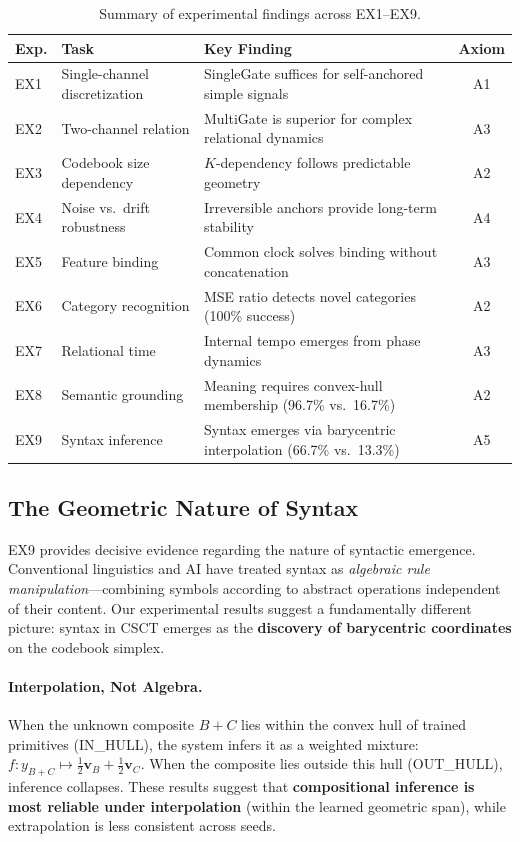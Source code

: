 \documentclass{article}
\begin{document}
\begin{table}[h]
\centering
\small
\caption{Summary of experimental findings across EX1--EX9.}
\label{tab:experiment_summary}
\begin{tabularx}{\linewidth}{@{} l p{3.5cm} X c @{}}
\toprule
\textbf{Exp.} & \textbf{Task} & \textbf{Key Finding} & \textbf{Axiom} \\
\midrule
EX1 & Single-channel discretization & SingleGate suffices for self-anchored simple signals & A1 \\
EX2 & Two-channel relation & MultiGate is superior for complex relational dynamics & A3 \\
EX3 & Codebook size dependency & $K$-dependency follows predictable geometry & A2 \\
EX4 & Noise vs.\ drift robustness & Irreversible anchors provide long-term stability & A4 \\
EX5 & Feature binding & Common clock solves binding without concatenation & A3 \\
EX6 & Category recognition & MSE ratio detects novel categories (100\% success) & A2 \\
EX7 & Relational time & Internal tempo emerges from phase dynamics & A3 \\
EX8 & Semantic grounding & Meaning requires convex-hull membership (96.7\% vs.\ 16.7\%) & A2 \\
EX9 & Syntax inference & Syntax emerges via barycentric interpolation (66.7\% vs.\ 13.3\%) & A5 \\
\bottomrule
\end{tabularx}
\end{table}

\subsection{The Geometric Nature of Syntax}

EX9 provides decisive evidence regarding the nature of syntactic emergence.
Conventional linguistics and AI have treated syntax as \emph{algebraic rule manipulation}---combining symbols according to abstract operations independent of their content.
Our experimental results suggest a fundamentally different picture: syntax in CSCT emerges as the \textbf{discovery of barycentric coordinates} on the codebook simplex.

\paragraph{Interpolation, Not Algebra.}
When the unknown composite $B{+}C$ lies within the convex hull of trained primitives (IN\_HULL), the system infers it as a weighted mixture: $f: y_{B+C} \mapsto \tfrac{1}{2}\mathbf{v}_B + \tfrac{1}{2}\mathbf{v}_C$.
When the composite lies outside this hull (OUT\_HULL), inference collapses.
These results suggest that \textbf{compositional inference is most reliable under interpolation} (within the learned geometric span), while extrapolation is less consistent across seeds.
\end{document}
